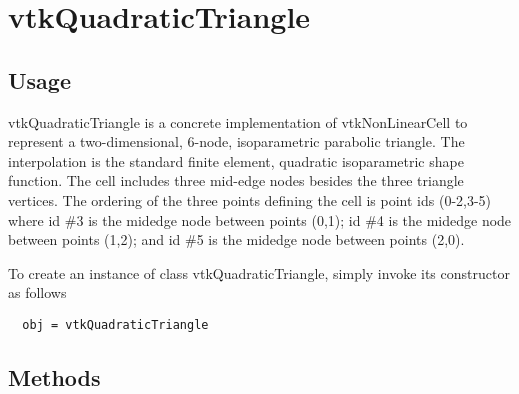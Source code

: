 \section{vtkQuadraticTriangle}

\subsection{Usage}

 vtkQuadraticTriangle is a concrete implementation of vtkNonLinearCell to
 represent a two-dimensional, 6-node, isoparametric parabolic triangle. The
 interpolation is the standard finite element, quadratic isoparametric
 shape function. The cell includes three mid-edge nodes besides the three
 triangle vertices. The ordering of the three points defining the cell is 
 point ids (0-2,3-5) where id \#3 is the midedge node between points
 (0,1); id \#4 is the midedge node between points (1,2); and id \#5 is the 
 midedge node between points (2,0).

To create an instance of class vtkQuadraticTriangle, simply
invoke its constructor as follows
\begin{verbatim}
  obj = vtkQuadraticTriangle
\end{verbatim}
\subsection{Methods}

